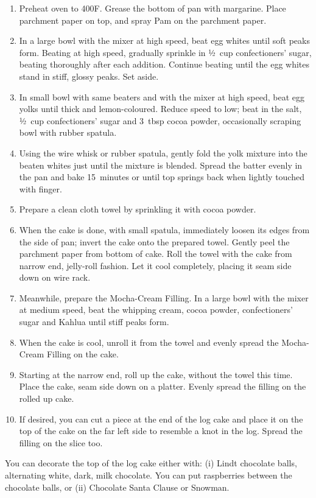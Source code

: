 \begin{enumerate}
    \item Preheat oven to 400\degree F. Grease the bottom of pan with margarine. Place parchment paper on top, and spray Pam on the parchment paper.
    \item In a large bowl with the mixer at high speed, beat egg whites until soft peaks form. Beating at high speed, gradually sprinkle in ½~cup confectioners' sugar, beating thoroughly after each addition. Continue beating until the egg whites stand in stiff, glossy peaks. Set aside.
    \item In small bowl with same beaters and with the mixer at high speed, beat egg yolks until thick and lemon-coloured. Reduce speed to low; beat in the salt, ½~cup confectioners' sugar and 3~tbsp cocoa powder, occasionally scraping bowl with rubber spatula.
    \item Using the wire whisk or rubber spatula, gently fold the yolk mixture into the beaten whites just until the mixture is blended. Spread the batter evenly in the pan and bake 15~minutes or until top springs back when lightly touched with finger.
    \item Prepare a clean cloth towel by sprinkling it with cocoa powder.
    \item When the cake is done, with small spatula, immediately loosen its edges from the side of pan; invert the cake onto the prepared towel. Gently peel the parchment paper from bottom of cake. Roll the towel with the cake from narrow end, jelly-roll fashion. Let it cool completely, placing it seam side down on wire rack.
    \item Meanwhile, prepare the Mocha-Cream Filling. In a large bowl with the mixer at medium speed, beat the whipping cream, cocoa powder, confectioners' sugar and Kahlua until stiff peaks form.
    \item When the cake is cool, unroll it from the towel and evenly spread the Mocha-Cream Filling on the cake.
    \item Starting at the narrow end, roll up the cake, without the towel this time. Place the cake, seam side down on a platter. Evenly spread the filling on the rolled up cake.
    \item If desired, you can cut a piece at the end of the log cake and place it on the top of the cake on the far left side to resemble a knot in the log. Spread the filling on the slice too.
\end{enumerate}

You can decorate the top of the log cake either with: (i) Lindt chocolate balls, alternating white, dark, milk chocolate. You can put raspberries between the chocolate balls, or (ii) Chocolate Santa Clause or Snowman.

